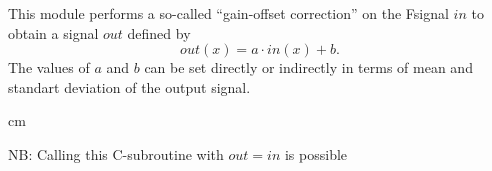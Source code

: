 
This module performs a so-called ``gain-offset correction'' on the Fsignal
$in$ to obtain a signal $out$ defined by 
$$out(x) = a \cdot in(x) + b.$$
The values of $a$ and $b$ can be set directly or indirectly in terms
of mean and standart deviation of the output signal.

 cm

NB: Calling this C-subroutine with $out=in$ is possible
